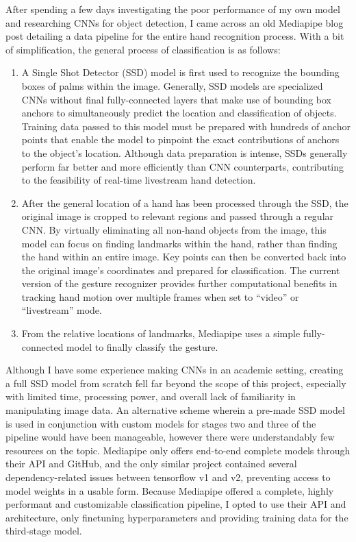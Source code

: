 \documentclass{article}
\begin{document}
After spending a few days investigating the poor performance of my own model and researching CNNs for object detection, I came across an old Mediapipe blog post \cite{mediapipeLegacyHands} detailing a data pipeline for the entire hand recognition process. With a bit of simplification, the general process of classification is as follows:
\begin{enumerate}
    \item A Single Shot Detector (SSD) model \cite{Liu_2016} is first used to recognize the bounding boxes of palms within the image. Generally, SSD models are specialized CNNs without final fully-connected layers that make use of bounding box anchors to simultaneously predict the location and classification of objects. Training data passed to this model must be prepared with hundreds of anchor points that enable the model to pinpoint the exact contributions of anchors to the object's location. Although data preparation is intense, SSDs generally perform far better and more efficiently than CNN counterparts, contributing to the feasibility of real-time livestream hand detection.
    \item After the general location of a hand has been processed through the SSD, the original image is cropped to relevant regions and passed through a regular CNN. By virtually eliminating all non-hand objects from the image, this model can focus on finding landmarks within the hand, rather than finding the hand within an entire image. Key points can then be converted back into the original image's coordinates and prepared for classification. The current version of the gesture recognizer \cite{gesture_recognizer} provides further computational benefits in tracking hand motion over multiple frames when set to ``video'' or ``livestream'' mode.
    \item From the relative locations of landmarks, Mediapipe uses a simple fully-connected model to finally classify the gesture.
\end{enumerate}

Although I have some experience making CNNs in an academic setting, creating a full SSD model from scratch fell far beyond the scope of this project, especially with limited time, processing power, and overall lack of familiarity in manipulating image data. An alternative scheme wherein a pre-made SSD model is used in conjunction with custom models for stages two and three of the pipeline would have been manageable, however there were understandably few resources on the topic. Mediapipe only offers end-to-end complete models through their API and GitHub, and the only similar project \cite{Dibia2017} contained several dependency-related issues between tensorflow v1 and v2, preventing access to model weights in a usable form. Because Mediapipe offered a complete, highly performant and customizable classification pipeline, I opted to use their API and architecture, only finetuning hyperparameters and providing training data for the third-stage model.
\end{document}
